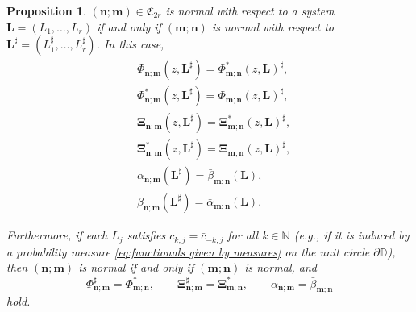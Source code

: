 \documentclass[reqno,centertags,11pt,draft]{amsart}
\newtheorem{prop}[thm]{Proposition}
\newcommand{\Z}{\mathbb{Z}}
\newcommand{\N}{\mathbb{N}}
\newcommand{\T}{\mathbb{\partial\mathbb{D}}}
\begin{document}
\begin{prop}\label{thm:reversal vs star polynomials}
    $(\bm{n};\bm{m})\in \mathfrak{C}_{2r}$ %
    is normal with respect to a system $\bm{L}=(L_1,\ldots,L_r)$ if and only if $(\bm{m};\bm{n})$ is normal with respect to $\bm{L}^\sharp =(L_1^\sharp,\ldots,L_r^\sharp)$. In this case,
\begin{align}
\label{eq:symm1}
    &\Phi_{\bm{n};\bm{m}}(z,\bm{L}^\sharp)  = \Phi^*_{\bm{m};\bm{n}}(z,\bm{L}) ^\sharp,
    \\
    \label{eq:symm2}
    &\Phi^*_{\bm{n};\bm{m}}(z,\bm{L}^\sharp) = \Phi_{\bm{m};\bm{n}}(z,\bm{L})^\sharp,
    \\
    \label{eq:symm3}
    &\bm\Xi_{\bm{n};\bm{m}}(z,\bm{L}^\sharp)  = \bm\Xi^*_{\bm{m};\bm{n}}(z,\bm{L}) ^\sharp,
    \\
    \label{eq:symm4}
    &\bm\Xi^*_{\bm{n};\bm{m}}(z,\bm{L}^\sharp) = \bm\Xi_{\bm{m};\bm{n}}(z,\bm{L})^\sharp,
    \\
    \label{eq:symm5}
    &\alpha_{\bm{n};\bm{m}}(\bm{L}^\sharp) = \bar{\beta}_{\bm{m};\bm{n}}(\bm{L}),
    \\
    \label{eq:symm6}
    &\beta_{\bm{n};\bm{m}}(\bm{L}^\sharp) = \bar{\alpha}_{\bm{m};\bm{n}}(\bm{L}).
    \end{align}

    Furthermore, if each $L_j$ satisfies $c_{k,j} = \bar{c}_{-k,j}$ for all $k\in\N$ (e.g., if it is induced by a probability measure \eqref{eq:functionals given by measures} on the unit circle $\T$), then $(\bm{n};\bm{m})$ is normal if and only if $(\bm{m};\bm{n})$ is normal, and 
    \begin{equation}\label{eq:symm7}
        \Phi_{\bm{n};\bm{m}}^\sharp = \Phi_{\bm{m};\bm{n}}^*,
        \qquad
        \bm{\Xi}_{\bm{n};\bm{m}}^\sharp = \bm{\Xi}_{\bm{m};\bm{n}}^*, 
        \qquad 
        \alpha_{\bm{n};\bm{m}} = \bar{\beta}_{\bm{m};\bm{n}}
    \end{equation}
    hold.
\end{prop}
\end{document}
